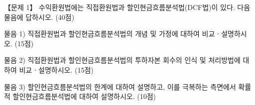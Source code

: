 \begin{longquestion}{【문제 1】}
수익환원법에는 직접환원법과 할인현금흐름분석법(DCF법)이 있다. 다음 물음에 답하시오. (40점) \par
\medskip\noindent 물음 1) 직접환원법과 할인현금흐름분석법의 개념 및 가정에 대하여 비교ㆍ설명하시오. (15점) \par
\medskip\noindent 물음 2) 직접환원법과 할인현금흐름분석법의 투하자본 회수의 인식 및 처리방법에 대하여 비교ㆍ설명하시오. (15점) \par
\medskip\noindent 물음 3) 할인현금흐름분석법의 한계에 대하여 설명하고, 이를 극복하는 측면에서 확률적 할인현금흐름분석법에 대하여 설명하시오. (10점) \par
\end{longquestion}
